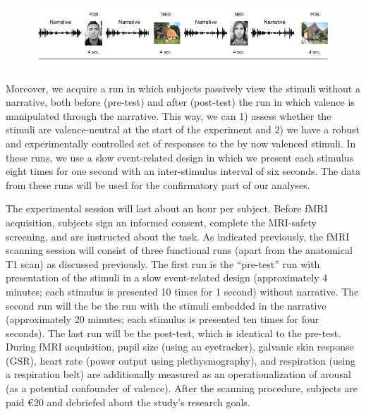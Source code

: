 \documentclass[12pt,a4paper]{article}\usepackage[]{graphicx}\usepackage[]{color}
\begin{document}
\begin{figure}[h]
\centering
\includegraphics[scale=.55]{exp_paradigm}
\end{figure}

Moreover, we acquire a run in which subjects passively view the stimuli without a narrative, both before (pre-test) and after (post-test) the run in which valence is manipulated through the narrative. This way, we can 1) assess whether the stimuli are valence-neutral at the start of the experiment and 2) we have a robust and experimentally controlled set of responses to the by now valenced stimuli. In these runs, we use a slow event-related design in which we present each stimulus eight times for one second with an inter-stimulus interval of six seconds. The data from these runs will be used for the confirmatory part of our analyses. 

The experimental session will last about an hour per subject. Before fMRI acquisition, subjects sign an informed consent, complete the MRI-safety screening, and are instructed about the task. As indicated previously, the fMRI scanning session will consist of three functional runs (apart from the anatomical T1 scan) as discussed previously. The first run is the ``pre-test'' run with presentation of the stimuli in a slow event-related design (approximately 4 minutes; each stimulus is presented 10 times for 1 second) without narrative. The second run will the be the run with the stimuli embedded in the narrative (approximately 20 minutes; each stimulus is presented ten times for four seconds). The last run will be the post-test, which is identical to the pre-test. During fMRI acquisition, pupil size (using an eyetracker), galvanic skin response (GSR), heart rate (power output using plethysmography), and respiration (using a respiration belt) are additionally measured as an operationalization of arousal (as a potential confounder of valence). After the scanning procedure, subjects are paid \euro 20 and debriefed about the study's research goals. 
\end{document}
